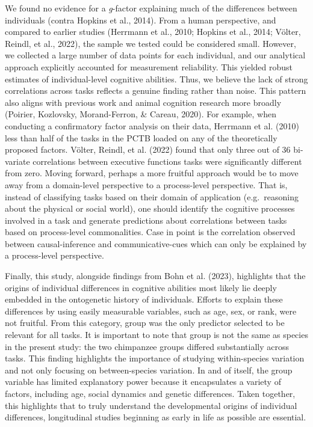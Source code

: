 \documentclass[
  man,floatsintext]{apa6}
\begin{document}
We found no evidence for a \emph{g}-factor explaining much of the differences between individuals (contra Hopkins et al., 2014). From a human perspective, and compared to earlier studies (Herrmann et al., 2010; Hopkins et al., 2014; Völter, Reindl, et al., 2022), the sample we tested could be considered small. However, we collected a large number of data points for each individual, and our analytical approach explicitly accounted for measurement reliability. This yielded robust estimates of individual-level cognitive abilities. Thus, we believe the lack of strong correlations across tasks reflects a genuine finding rather than noise. This pattern also aligns with previous work and animal cognition research more broadly (Poirier, Kozlovsky, Morand-Ferron, \& Careau, 2020). For example, when conducting a confirmatory factor analysis on their data, Herrmann et al. (2010) less than half of the tasks in the PCTB loaded on any of the theoretically proposed factors. Völter, Reindl, et al. (2022) found that only three out of 36 bi-variate correlations between executive functions tasks were significantly different from zero. Moving forward, perhaps a more fruitful approach would be to move away from a domain-level perspective to a process-level perspective. That is, instead of classifying tasks based on their domain of application (e.g.~reasoning about the physical or social world), one should identify the cognitive processes involved in a task and generate predictions about correlations between tasks based on process-level commonalities. Case in point is the correlation observed between causal-inference and communicative-cues which can only be explained by a process-level perspective.

Finally, this study, alongside findings from Bohn et al. (2023), highlights that the origins of individual differences in cognitive abilities most likely lie deeply embedded in the ontogenetic history of individuals. Efforts to explain these differences by using easily measurable variables, such as age, sex, or rank, were not fruitful. From this category, group was the only predictor selected to be relevant for all tasks. It is important to note that group is not the same as species in the present study: the two chimpanzee groups differed substantially across tasks. This finding highlights the importance of studying within-species variation and not only focusing on between-species variation. In and of itself, the group variable has limited explanatory power because it encapsulates a variety of factors, including age, social dynamics and genetic differences. Taken together, this highlights that to truly understand the developmental origins of individual differences, longitudinal studies beginning as early in life as possible are essential.
\end{document}
